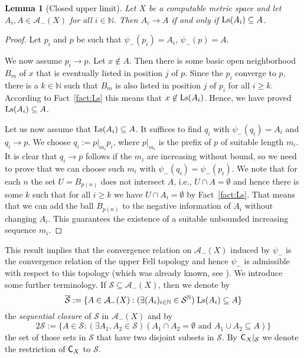 \documentclass[a4paper]{amsart}
\def\AA{{\mathcal A}}
\def\SS{{\mathcal S}}
\def\IN{{\mathbb{N}}}
\def\In{\subseteq}
\def\Ls{{\rm Ls}}
\def\C{\mbox{\rm\sffamily C}}
\newtheorem{lemma}[theorem]{Lemma}
\theoremstyle{definition}
\begin{document}
\begin{lemma}[Closed upper limit]
\label{lem:closed-upper-limit}
Let $X$ be a computable metric space and let $A_i,A\in\AA_-(X)$ for all $i\in\IN$.
Then $A_i\to A$ if and only if $\Ls(A_i)\In A$.
\end{lemma}
\begin{proof}
Let $p_i$ and $p$ be such that $\psi_-(p_i)=A_i$, $\psi_-(p)=A$.

We now assume $p_i\to p$.
Let $x\not\in A$. Then there is some basic open neighborhood $B_m$ of $x$ that
is eventually listed in position $j$ of $p$. Since the $p_i$ converge to $p$, there is
a $k\in\IN$ such that $B_m$ is also listed in position $j$ of $p_i$ for all $i\geq k$. 
According to Fact~\ref{fact:Ls} this means that $x\not\in\Ls(A_i)$.
Hence, we have proved $\Ls(A_i)\In A$.

Let us now assume that $\Ls(A_i)\In A$. It suffices to find $q_i$ with $\psi_-(q_i)=A_i$ and $q_i\to p$.
We choose $q_i:=p|_{m_i}p_i$, where $p|_{m_i}$ is the prefix of $p$ of suitable length $m_i$.
It is clear that $q_i\to p$ follows if the $m_i$ are increasing without bound, so we need to prove that we can choose 
such $m_i$ with $\psi_-(q_i)=\psi_-(p_i)$. We note that for each $n$ the set $U=B_{p(n)}$
does not intersect $A$, i.e., $U\cap A=\emptyset$ and hence there is some $k$ such that for all $i\geq k$
we have $U\cap A_i=\emptyset$ by Fact~\ref{fact:Ls}. That means that we can add the ball $B_{p(n)}$ to 
the negative information of $A_i$ without changing $A_i$. This guarantees the existence of a suitable
unbounded increasing sequence $m_i$.
\end{proof}

This result implies that the convergence relation on $\AA_-(X)$ induced by $\psi_-$ is the
convergence relation of the upper Fell topology and hence $\psi_-$ is admissible with respect to this
topology (which was already known, see \cite{Sch02c}).
We introduce some further terminology. 
If $\SS\In\AA_-(X)$, then we denote by 
\[\overline{\SS}:=\{A\in\AA_-(X):(\exists (A_i)_{i\in\IN}\in\SS^\IN)\;\Ls(A_i)\In A\}\] 
the {\em sequential closure} of $\SS$ in $\AA_-(X)$ and by 
\[2\SS:=\{A\in\SS:(\exists A_1,A_2\in\SS)(A_1\cap A_2=\emptyset\mbox{ and }A_1\cup A_2\In A)\}\]
the set of those sets in $\SS$ that have two disjoint subsets in $\SS$.
By $\C_X|_\SS$ we denote the restriction of $\C_X$ to $\SS$.
\end{document}
